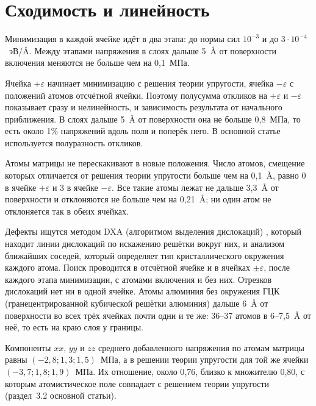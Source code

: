 \documentclass[11pt,a4paper]{article}
\begin{document}
\section{Сходимость и линейность}

Минимизация в каждой ячейке идёт в два этапа: до нормы сил $10^{-3}$
и до $3\cdot10^{-4}$~эВ/\AA. Между этапами напряжения в слоях дальше 5~\AA{}
от поверхности включения меняются не больше чем на 0{,}1~МПа.

Ячейка $+\varepsilon$ начинает минимизацию с решения теории упругости,
ячейка $-\varepsilon$ с положений атомов отсчётной ячейки. Поэтому
полусумма откликов на $+\varepsilon$ и $-\varepsilon$ показывает сразу
и нелинейность, и зависимость результата от начального приближения.
В слоях дальше 5~\AA{} от поверхности она не больше 0{,}8~МПа, то есть
около 1\% напряжений вдоль поля и поперёк него. В основной статье
используется полуразность откликов.

Атомы матрицы не перескакивают в новые положения. Число атомов, смещение
которых отличается от решения теории упругости больше чем на 0{,}1~\AA,
равно 0 в ячейке $+\varepsilon$ и 3 в ячейке $-\varepsilon$.
Все такие атомы лежат не дальше 3{,}3~\AA{} от поверхности
и отклоняются не больше чем на 0{,}21~\AA; ни один атом не
отклоняется так в обеих ячейках.

Дефекты ищутся методом DXA (алгоритмом выделения дислокаций)
\cite{Stukowski2012DXA}, который находит линии дислокаций по искажению
решётки вокруг них, и анализом ближайших соседей, который определяет тип
кристаллического окружения каждого атома. Поиск проводится в отсчётной
ячейке и в ячейках $\pm\varepsilon$, после каждого этапа минимизации,
с атомами включения и без них. Отрезков дислокаций нет ни в одной ячейке.
Атомы алюминия без окружения ГЦК (гранецентрированной кубической решётки
алюминия) дальше 6~\AA{} от
поверхности во всех трёх ячейках почти одни и те же: 36--37 атомов
в 6--7{,}5~\AA{} от неё, то есть на краю слоя у границы.

Компоненты $xx$, $yy$ и $zz$ среднего добавленного напряжения по атомам
матрицы равны $(-2{,}8; 1{,}3; 1{,}5)$~МПа, а в решении теории упругости для той же
ячейки $(-3{,}7; 1{,}8; 1{,}9)$~МПа. Их отношение, около 0{,}76, близко к множителю
0{,}80, с которым атомистическое поле совпадает с решением теории
упругости (раздел~3.2 основной статьи).
\end{document}
